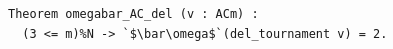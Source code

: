 \begin{lstlisting}[language=Rocq]
Theorem omegabar_AC_del (v : ACm) :
  (3 <= m)%N -> `$\bar\omega$`(del_tournament v) = 2.
\end{lstlisting}
